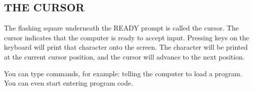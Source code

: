 \subsection{THE CURSOR}

The flashing square underneath the READY prompt is called the cursor. The cursor indicates that the computer is ready to accept input. Pressing keys on the keyboard will print that character onto the screen. The character will be printed at the current cursor position, and the cursor will advance to the next position.

You can type commands, for example: telling the computer to load a program. You can even start entering program code.
